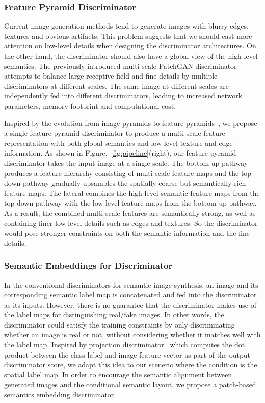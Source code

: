 \documentclass{article}
\begin{document}
\subsubsection{Feature Pyramid Discriminator}
Current image generation methods tend to generate images with blurry edges, textures and obvious artifacts.
This problem suggests that we should cast more attention on low-level details when designing the discriminator architectures.
On the other hand, the discriminator should also have a global view of the high-level semantics.
The previously introduced multi-scale PatchGAN discriminator~\cite{wang2018high} attempts to balance large receptive field and fine details by multiple discriminators at different scales.
The same image at different scales are independently fed into different discriminators, leading to increased network parameters, memory footprint and computational cost. 



Inspired by the evolution from image pyramids to feature pyramids~\cite{lin2017feature}, we propose a single feature pyramid discriminator to produce a multi-scale feature representation with both global semantics and low-level texture and edge information.
As shown in Figure.~\ref{fig:pipeline}(right), our feature pyramid discriminator takes the input image at a single scale.
The bottom-up pathway produces a feature hierarchy consisting of multi-scale feature maps and the top-down pathway gradually upsamples the spatially coarse but semantically rich feature maps.
The lateral combines the high-level semantic feature maps from the top-down pathway with the low-level feature maps from the bottom-up pathway. 
As a result, the combined multi-scale features are semantically strong, as well as containing finer low-level details such as edges and textures.
So the discriminator would pose stronger constraints on both the semantic information and the fine details. 

\subsubsection{Semantic Embeddings for Discriminator}
In the conventional discriminators for semantic image synthesis, an image and its corresponding semantic label map is concatenated and fed into the discriminator as its inputs.
However, there is no guarantee that the discriminator makes use of the label maps for distinguishing real/fake images.
In other words, the discriminator could satisfy the training constraints by only discriminating whether an image is real or not, without considering whether it matches well with the label map.
Inspired by projection discriminator~\cite{miyato2018cgans} which computes the dot product between the class label and image feature vector as part of the output discriminator score, we adapt this idea to our scenerio where the condition is the spatial label map.
In order to encourage the semantic alignment between generated images and the conditional semantic layout, we propose a patch-based semantics embedding discriminator.
\end{document}
